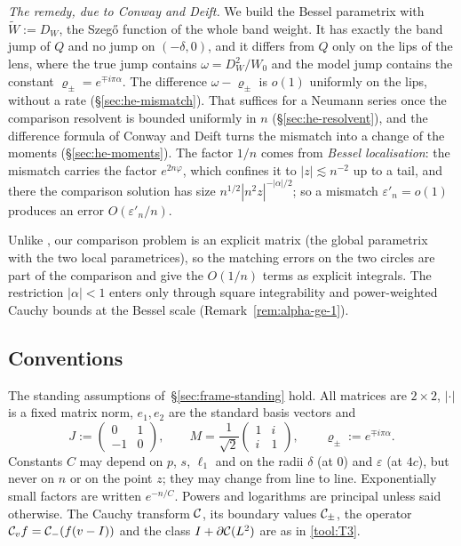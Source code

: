 \emph{The remedy, due to Conway and Deift.} We build the Bessel parametrix with $\tilde W:=D_W$, the Szeg\H{o}
function of the whole band weight. It has exactly the band jump of $Q$ and no jump on $(-\delta,0)$, and it differs
from $Q$ only on the lips of the lens, where the true jump contains $\omega=D_W^2/W_0$ and the model jump contains the
constant $\varrho_\pm=e^{\mp i\pi\alpha}$. The difference $\omega-\varrho_\pm$ is $o(1)$ uniformly on the lips, without
a rate (\S\ref{sec:he-mismatch}). That suffices for a Neumann series once the comparison resolvent is bounded uniformly
in $n$ (\S\ref{sec:he-resolvent}), and the difference formula of Conway and Deift turns the mismatch into a change of the
moments (\S\ref{sec:he-moments}). The factor $1/n$ comes from \emph{Bessel localisation}: the mismatch carries the factor
$e^{2n\varphi}$, which confines it to $|z|\lesssim n^{-2}$ up to a tail, and there the comparison solution has size
$n^{1/2}|n^2z|^{-|\alpha|/2}$; so a mismatch $\varepsilon'_n=o(1)$ produces an error $O(\varepsilon'_n/n)$.

Unlike \cite{CD}, our comparison problem is an explicit matrix (the global parametrix with the two local parametrices),
so the matching errors on the two circles are part of the comparison and give the $O(1/n)$ terms as explicit integrals.
The restriction $|\alpha|<1$ enters only through square integrability and power-weighted Cauchy bounds at the Bessel
scale (Remark~\ref{rem:alpha-ge-1}).

\subsection{Conventions}\label{sec:he-conv}

The standing assumptions of~\S\ref{sec:frame-standing} hold. All matrices are $2\times2$, $|\cdot|$ is a fixed matrix
norm, $e_1,e_2$ are the standard basis vectors and
\[
  J:=\begin{pmatrix}0&1\\-1&0\end{pmatrix},\qquad M=\frac1{\sqrt2}\begin{pmatrix}1&i\\i&1\end{pmatrix},\qquad
  \varrho_\pm:=e^{\mp i\pi\alpha}.
\]
Constants $C$ may depend on $p$, $s$, $\ell_1$ and on the radii $\delta$ (at $0$) and $\varepsilon$ (at $4c$), but never
on $n$ or on the point $z$; they may change from line to line. Exponentially small factors are written $e^{-n/C}$.
Powers and logarithms are principal unless said otherwise. The Cauchy transform $\mathcal{C}$, its boundary values
$\mathcal{C}_\pm$, the operator $\mathcal{C}_vf=\mathcal{C}_-(f(v-I))$ and the class $I+\partial\mathcal{C}(L^2)$ are as in \ref{tool:T3}.

